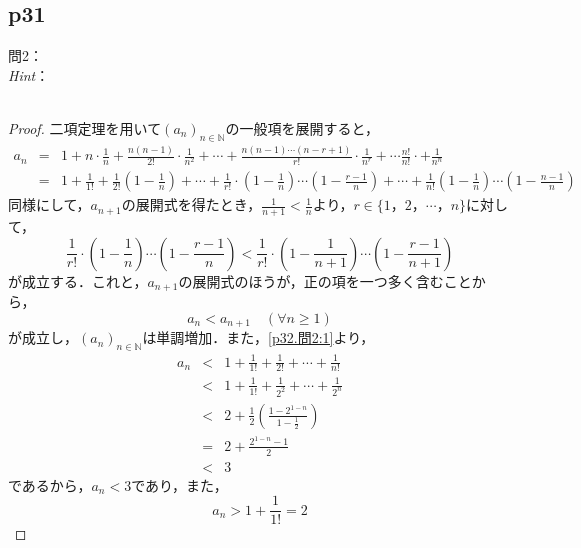 \documentclass[dvipdfmx,uplatex,11pt]{jsarticle}
\begin{document}
\subsection{p31}
\noindent
問2：
\\
\textsl{Hint}：\\
\dotfill
​
\begin{leftbar}
	\begin{proof}
		二項定理を用いて$(a_n)_{n \in \mathbb{N}}$の一般項を展開すると，
		\begin{eqnarray}
			a_n & = & 1 + n \cdot \frac{1}{n} + \frac{n(n-1)}{2!} \cdot \frac{1}{n^2} + \cdots + \frac{n(n-1)\cdots(n-r+1)}{r!} \cdot \frac{1}{n^r} + \cdots \frac{n!}{n!} \cdot + \frac{1}{n^n} \nonumber  \\
			& = & 1+ \frac{1}{1!} + \frac{1}{2!} \left(1- \frac{1}{n} \right) + \cdots + \frac{1}{r!} \cdot  \left(1 - \frac{1}{n} \right) \cdots \left (1-\frac{r-1}{n} \right) + \cdots \nonumber +  \frac{1}{n!} \left(1 - \frac{1}{n} \right) \cdots \left(1- \frac{n-1}{n} \right) \label{p32.問2:1}
		\end{eqnarray}
		同様にして，$a_{n+1}$の展開式を得たとき，$ \frac{1}{n+1} < \frac{1}{n}$より，$r\in \{ 1，2，\cdots ，n\}$に対して，
		\begin{equation}
			\frac{1}{r!} \cdot  \left(1 - \frac{1}{n} \right) \cdots \left (1-\frac{r-1}{n} \right) < \frac{1}{r!} \cdot  \left(1 - \frac{1}{n+1} \right) \cdots \left (1-\frac{r-1}{n+1} \right)
		\end{equation}
		が成立する．これと，$a_{n+1}$の展開式のほうが，正の項を一つ多く含むことから，
		\begin{equation}
			a_{n} < a_{n+1} \quad (\forall n \ge 1)
		\end{equation}
		が成立し，$(a_n)_{n \in \mathbb{N}}$は単調増加．また，\eqref{p32.問2:1}より，
		\begin{eqnarray}
			\label{p32.問2:2}
			a_n &<& 1 + \frac{1}{1!} + \frac{1}{2!} + \cdots + \frac{1}{n!} \\
			& < & 1 + \frac{1}{1!} + \frac{1}{2^2} + \cdots + \frac{1}{2^n} \\
			& < & 2 + \frac{1}{2} \left( \frac{ 1 - 2^{1-n} }{ 1- \frac{1}{2} } \right)\\
			& = & 2+ \frac{2^{1-n} -1}{2} \\
			\label{p32.問2:3}
			& < & 3
		\end{eqnarray}
		であるから，$a_n < 3$であり，また，
		\begin{equation}
			\label{p32.問2:4}
			a_n > 1 + \frac{1}{1!} =2
		\end{equation}

\end{proof}
\end{leftbar}
\end{document}
